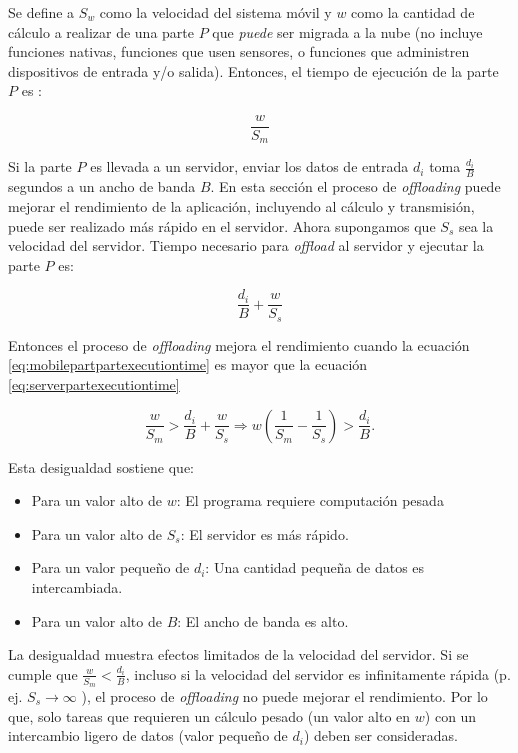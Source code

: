 Se define a $S_w$ como la velocidad del sistema móvil y $w$ como la cantidad de cálculo a realizar de una parte $P$ que \textit{puede} ser 
migrada a la nube (no incluye funciones nativas, funciones que usen sensores, o funciones que administren dispositivos de entrada y/o salida).
Entonces, el tiempo de ejecución de la parte $P$ es : 

\begin{equation} \label{eq:mobilepartpartexecutiontime}
 \frac{w}{S_m}
\end{equation}

Si la parte $P$ es llevada a un servidor, enviar los datos de entrada $d_i$ toma $\frac{d_i}{B}$ segundos a un ancho de banda $B$. En esta 
sección el proceso de \textit{offloading} puede mejorar el rendimiento de la aplicación, incluyendo al 
cálculo y transmisión, puede ser realizado más rápido en el servidor. Ahora supongamos que $S_s$ sea la velocidad del servidor. Tiempo 
necesario para \textit{offload} al servidor y ejecutar la parte $P$ es: 

\begin{equation} \label{eq:serverpartexecutiontime}
 \frac{d_i}{B} + \frac{w}{S_s}  
\end{equation}

Entonces el proceso de \textit{offloading} mejora el rendimiento cuando la ecuación \ref{eq:mobilepartpartexecutiontime} es mayor que la ecuación
\ref{eq:serverpartexecutiontime}

\begin{equation} \label{eq:executiontimeFinal}
 \frac{w}{S_m}  > \frac{d_i}{B} +  \frac{w}{S_s} \Rightarrow w \left(\frac{1}{S_m} - \frac{1}{S_s} \right) > \frac{d_i}{B}.
\end{equation}

Esta desigualdad sostiene que:

\begin{itemize}
 \item Para un valor alto de $w$: El programa requiere computación pesada
 \item Para un valor alto de $S_s$: El servidor es más rápido.
 \item Para un valor pequeño de $d_i$: Una cantidad pequeña de datos es intercambiada.
 \item Para un valor alto de $B$: El ancho de banda es alto. 
\end{itemize}

La desigualdad muestra efectos limitados de la velocidad del servidor. Si se cumple que $\frac{w}{S_m}<\frac{d_i}{B}$, incluso si la
velocidad del servidor es infinitamente rápida (p. ej. $S_s \rightarrow \infty $  ), el proceso de \textit{offloading} no puede mejorar 
el rendimiento. Por lo que, solo tareas que requieren un cálculo pesado (un valor alto en $w$) con un intercambio ligero de datos (valor 
pequeño de $d_i$) deben ser consideradas. 


